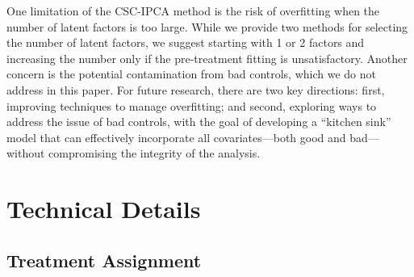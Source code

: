 \documentclass[12pt]{article}
\begin{document}
One limitation of the CSC-IPCA method is the risk of overfitting when the number of latent factors is too large. While we provide two methods for selecting the number of latent factors, we suggest starting with 1 or 2 factors and increasing the number only if the pre-treatment fitting is unsatisfactory. Another concern is the potential contamination from bad controls, which we do not address in this paper. For future research, there are two key directions: first, improving techniques to manage overfitting; and second, exploring ways to address the issue of bad controls, with the goal of developing a ``kitchen sink'' model that can effectively incorporate all covariates—both good and bad—without compromising the integrity of the analysis.

\clearpage
\begingroup
{}


\endgroup

\clearpage
\appendix
{}
\renewcommand{\theequation}{\thesection.\arabic{equation}}
\setcounter{equation}{0}
\renewcommand{\theassumption}{\thesection.\arabic{assumption}}
\setcounter{assumption}{1}
\renewcommand{\thefigure}{\thesection.\arabic{figure}}
\setcounter{figure}{0}
\renewcommand{\thetable}{\thesection.\arabic{table}}
\setcounter{figure}{0}

\section{Technical Details} 
\label{sec: tech details}

\subsection{Treatment Assignment}
\label{app: treatment assignment}
\end{document}

